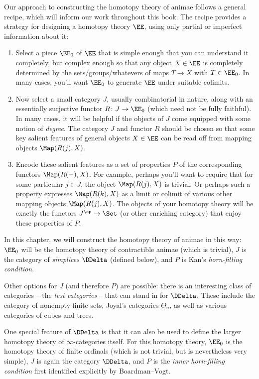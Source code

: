 Our approach to constructing the homotopy theory of animae follows a general recipe, which will inform our work throughout this book.
The recipe provides a strategy for designing a homotopy theory $\EE$, using only partial or imperfect information about it:
\begin{enumerate}
  \item%
    Select a piece $\EE_0$ of $\EE$ that is simple enough that you can understand it completely,
    but complex enough so that any object $X \in \EE$ is completely determined by the sets/groups/whatevers of maps $T \to X$ with $T \in \EE_0$.
    In many cases, you'll want $\EE_0$ to generate $\EE$ under suitable colimits.
  \item%
    Now select a small category $J$, usually combinatorial in nature,
    along with an essentially surjective functor $R \colon J \to \EE_0$ (which need not be fully faithful).
    In many cases, it will be helpful if the objects of $J$ come equipped with some notion of \emph{degree}.
    The category $J$ and functor $R$ should be chosen so that some key salient features of general objects $X \in \EE$ can be read off from mapping objects $\Map(R(j),X)$.
  \item%
    Encode these salient features as a set of properties $P$ of the corresponding functors $\Map(R(-),X)$.
    For example, perhaps you'll want to require that for some particular $j \in J$, the object $\Map(R(j),X)$ is trivial.
    Or perhaps such a property expresses $\Map(R(k),X)$ as a limit or colimit of various other mapping objects $\Map(R(j),X)$.
    The objects of your homotopy theory will be exactly the functors $J^{\op} \to \Set$ (or other enriching category) that enjoy these properties of $P$.
\end{enumerate}

In this chapter, we will construct the homotopy theory of animae in this way:
$\EE_0$ will be the homotopy theory of contractible animae (which is trivial),
$J$ is the category of \emph{simplices} $\DDelta$ (defined below),
and $P$ is Kan's \emph{horn-filling condition}.

Other options for $J$ (and therefore $P$) are possible:
there is an interesting class of categories -- the \emph{test categories} -- that can stand in for $\DDelta$. 
These include the category of nonempty finite sets, Joyal's categories $\Theta_n$, as well as various categories of cubes and trees.

One special feature of $\DDelta$ is that it can also be used to define the larger homotopy theory of $\infty$-categories itself.
For this homotopy theory, $\EE_0$ is the homotopy theory of finite ordinals (which is not trivial, but is nevertheless very simple),
$J$ is again the category $\DDelta$,
and $P$ is the \emph{inner horn-filling condition} first identified explicitly by Boardman--Vogt.




